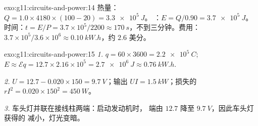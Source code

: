 \begin{solution}{exo:g11:circuits-and-power:14}
热量：$Q = 1.0 \times 4180 \times (100 - 20) = \qty{3.3e5}{J}$。
：$E = Q/0.90 = \qty{3.7e5}{J}$。时间：$t = E/P =
3.7\times10^{5}/2200 \approx \qty{170}{s}$，不到三分钟。费用：
$3.7\times10^{5}/3.6\times10^{6} \approx \qty{0.10}{kW.h}$，约 $2.6$
美分。
\end{solution}

\begin{solution}{exo:g11:circuits-and-power:15}
\emph{1.} $q = 60 \times 3600 = \qty{2.2e5}{C}$; $E \approx \mathcal{E}q
= 12.7 \times 2.16\times10^{5} = \qty{2.7e6}{J} \approx \qty{0.76}{kW.h}$.

\emph{2.} $U = 12.7 - 0.020 \times 150 = \qty{9.7}{V}$；输出
$UI = \qty{1.5}{kW}$；损失的 $rI^2 = 0.020 \times 150^2 = \qty{450}{W}$。

\emph{3.} 车头灯并联在接线柱两端：启动发动机时，
端由 $12.7$ 降至 $\qty{9.7}{V}$，因此车头灯获得的
减小，灯光变暗。
\end{solution}

